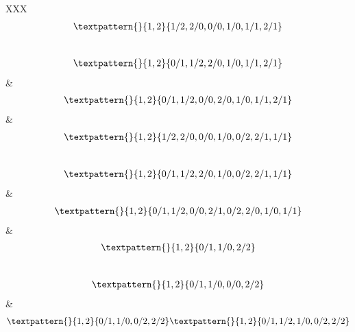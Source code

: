 \begin{center}
\begin{longtabu}[l]{XXX}
\begin{equation}
\begin{gathered}
		\textpattern{}{1,2}{1/2,2/0,0/0,1/0,1/1,2/1}
	\end{gathered}
	\label{cls:82}
\end{equation}
\\
\begin{equation}
	\begin{gathered}
		\textpattern{}{1,2}{0/1,1/2,2/0,1/0,1/1,2/1}
	\end{gathered}
	\label{cls:83}
\end{equation}
&
\begin{equation}
	\begin{gathered}
		\textpattern{}{1,2}{0/1,1/2,0/0,2/0,1/0,1/1,2/1}
	\end{gathered}
	\label{cls:84}
\end{equation}
&
\begin{equation}
	\begin{gathered}
		\textpattern{}{1,2}{1/2,2/0,0/0,1/0,0/2,2/1,1/1}
	\end{gathered}
	\label{cls:85}
\end{equation}
\\
\begin{equation}
	\begin{gathered}
		\textpattern{}{1,2}{0/1,1/2,2/0,1/0,0/2,2/1,1/1}
	\end{gathered}
	\label{cls:86}
\end{equation}
&
\begin{equation}
	\begin{gathered}
		\textpattern{}{1,2}{0/1,1/2,0/0,2/1,0/2,2/0,1/0,1/1}
	\end{gathered}
	\label{cls:87}
\end{equation}
&
\begin{equation}
	\begin{gathered}
		\textpattern{}{1,2}{0/1,1/0,2/2}
	\end{gathered}
	\label{cls:88}
\end{equation}
\\
\begin{equation}
	\begin{gathered}
		\textpattern{}{1,2}{0/1,1/0,0/0,2/2}
	\end{gathered}
	\label{cls:89}
\end{equation}
    &
\begin{equation}
	\begin{gathered}
		\textpattern{}{1,2}{0/1,1/0,0/2,2/2}
		\textpattern{}{1,2}{0/1,1/2,1/0,0/2,2/2}
	\end{gathered}
	\label{cls:90}

\end{equation}
\end{longtabu}
\end{center}
